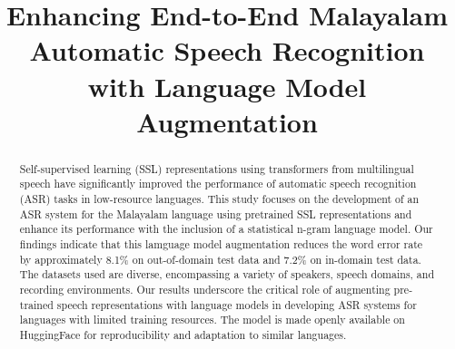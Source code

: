 \documentclass[runningheads]{llncs}
\begin{document}
%
\title{Enhancing End-to-End Malayalam Automatic Speech Recognition with Language Model Augmentation}

%
%
\maketitle              %
%
\begin{abstract}

Self-supervised learning (SSL) representations using transformers from multilingual speech have significantly improved the performance of automatic speech recognition (ASR) tasks in low-resource languages. This study focuses on the development of an ASR system for the Malayalam language using pretrained SSL representations and enhance its performance with the inclusion of a statistical n-gram language model. Our findings indicate that this lamguage model augmentation reduces the word error rate by approximately 8.1\% on out-of-domain test data and 7.2\% on in-domain test data. The datasets used are diverse, encompassing a variety of speakers, speech domains, and recording environments.  Our results underscore the critical role of augmenting pre-trained speech representations with language models in developing ASR systems for languages with limited training resources. The model is made openly available on HuggingFace for reproducibility and adaptation to similar languages.
 
\end{abstract}
\end{document}
